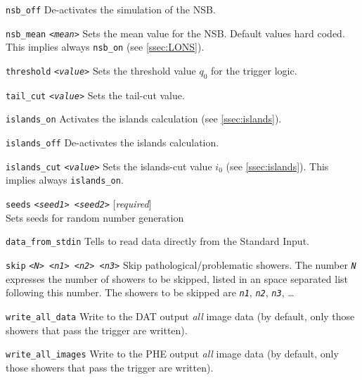 \begin{Uentry}
\item[\texttt{nsb\_off}]
%
  De-activates the simulation of the NSB.

\item[\texttt{nsb\_mean} \quad
  \texttt{<\emph{mean}>}]
%
  Sets the mean value for the NSB. Default values hard coded. This
  implies always \texttt{nsb\_on} (see \ref{ssec:LONS}).

\item[\texttt{threshold} \quad
  \texttt{<\emph{value}>}]
%
  Sets the threshold value $q_0$ for the trigger logic.

\item[\texttt{tail\_cut} \quad
  \texttt{<\emph{value}>}]
%
  Sets the tail-cut value.

\item[\texttt{islands\_on}]
%
  Activates the islands calculation (see \ref{ssec:islands}).

\item[\texttt{islands\_off}]
%
  De-activates the islands calculation. 

\item[\texttt{islands\_cut} \quad
  \texttt{<\emph{value}>}]
%
  Sets the islands-cut value $i_0$ (see \ref{ssec:islands}). This
  implies always \texttt{islands\_on}.

\item[\texttt{seeds} \quad
  \texttt{<\emph{seed1}>  <\emph{seed2}>}]
%
  [\emph{required}] \\
  Sets seeds for random number generation

\item[\texttt{data\_from\_stdin}]
%
  Tells \camera to read data directly from the Standard Input.

\item[\texttt{skip} \quad
  \texttt{<\emph{N}>  <\emph{n1}>  <\emph{n2}>  <\emph{n3}>}]
%
  Skip pathological/problematic showers. The number \texttt{\emph{N}}
  expresses the number of showers to be skipped, listed in an space
  separated list following this number. The showers to be skipped are
  \texttt{\emph{n1}}, \texttt{\emph{n2}}, \texttt{\emph{n3}}, \ldots

\item[\texttt{write\_all\_data}]
%
  Write to the DAT output \emph{all} image data (by default, only
  those showers that pass the trigger are written).

\item[\texttt{write\_all\_images}]
%
  Write to the PHE output \emph{all} image data (by default, only
  those showers that pass the trigger are written).


\end{Uentry}
